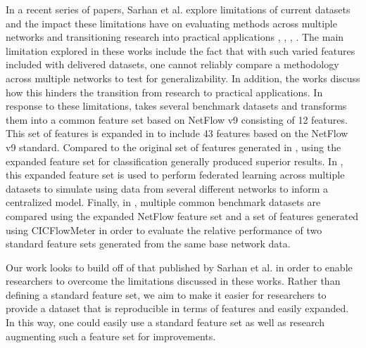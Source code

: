\documentclass[conference]{IEEEtran}
\begin{document}
In a recent series of papers, Sarhan et al. explore limitations of current datasets and the impact these limitations have on evaluating methods across multiple networks and transitioning research into practical applications \cite{sarhan2020netflow}, \cite{sarhan2021cyber}, \cite{Sarhan2021}, \cite{sarhan_arxiv2021}.
The main limitation explored in these works include the fact that with such varied features included with delivered datasets, one cannot reliably compare a methodology across multiple networks to test for generalizability.
In addition, the works discuss how this hinders the transition from research to practical applications. 
In response to these limitations, \cite{sarhan2020netflow} takes several benchmark datasets and transforms them into a common feature set based on NetFlow v9 consisting of 12 features.
This set of features is expanded in \cite{Sarhan2021} to include 43 features based on the NetFlow v9 standard.
Compared to the original set of features generated in \cite{sarhan2020netflow}, using the expanded feature set for classification generally produced superior results.
In \cite{sarhan2021cyber}, this expanded feature set is used to perform federated learning across multiple datasets to simulate using data from several different networks to inform a centralized model.
Finally, in \cite{sarhan_arxiv2021}, multiple common benchmark datasets are compared using the expanded NetFlow feature set and a set of features generated using CICFlowMeter \cite{lashkari2017characterization} in order to evaluate the relative performance of two standard feature sets generated from the same base network data.

Our work looks to build off of that published by Sarhan et al. in order to enable researchers to overcome the limitations discussed in these works.
Rather than defining a standard feature set, we aim to make it easier for researchers to provide a dataset that is reproducible in terms of features and easily expanded.
In this way, one could easily use a standard feature set as well as research augmenting such a feature set for improvements.
\end{document}
